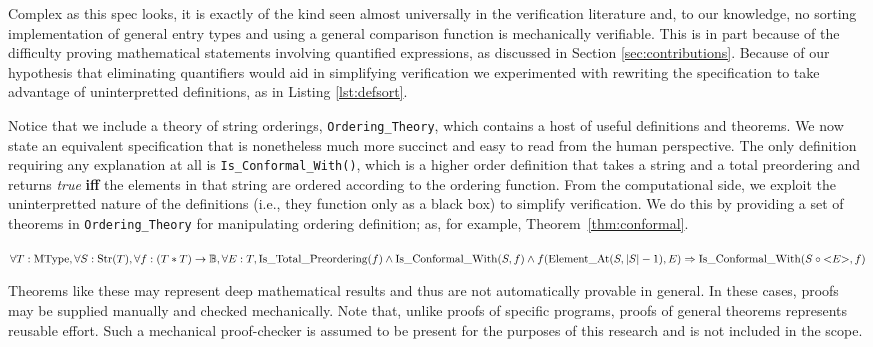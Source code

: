 Complex as this spec looks, it is exactly of the kind seen almost universally in the verification literature and, to our knowledge, no sorting implementation of general entry types and using a general comparison function is mechanically verifiable.  This is in part because of the difficulty proving mathematical statements involving quantified expressions, as discussed in Section \ref{sec:contributions}.  Because of our hypothesis that eliminating quantifiers would aid in simplifying verification we experimented with rewriting the specification to take advantage of uninterpretted definitions, as in Listing \ref{lst:defsort}.



Notice that we include a theory of string orderings, \texttt{Ordering\_Theory}, which contains a host of useful definitions and theorems.  We now state an equivalent specification that is nonetheless much more succinct and easy to read from the human perspective.  The only definition requiring any explanation at all is \texttt{Is\_Conformal\_With()}, which is a higher order definition that takes a string and a total preordering and returns \emph{true} \textbf{iff} the elements in that string are ordered according to the ordering function.  From the computational side, we exploit the uninterpretted nature of the definitions (i.e., they function only as a black box) to simplify verification.  We do this by providing a set of theorems in \texttt{Ordering\_Theory} for manipulating ordering definition; as, for example, Theorem~\ref{thm:conformal}.

\begin{thm}
\label{thm:conformal}
$\forall T : \mathrm{MType}, \forall S : \mathrm{Str}(T), 
\forall f : (T * T) \rightarrow \mathbb{B}, \forall E : T,\\
\mathrm{Is\_Total\_Preordering}(f) \wedge \mathrm{Is\_Conformal\_With}(S, f) \wedge f(\mathrm{Element\_At}(S, |S| - 1), E) \Rightarrow\\ \mathrm{Is\_Conformal\_With}(S \circ \mathrm{<}E\mathrm{>}, f)$
\end{thm}

Theorems like these may represent deep mathematical results and thus are not automatically provable in general.  In these cases, proofs may be supplied manually and checked mechanically\cite{smith08}.  Note that, unlike proofs of specific programs, proofs of general theorems represents reusable effort.  Such a mechanical proof-checker is assumed to be present for the purposes of this research and is not included in the scope.  

